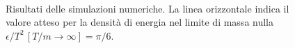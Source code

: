 \documentclass[a4paper,11pt]{article}
\begin{document}
    \begin{figure}[htb]
        \centering
         \\
        \caption{Risultati delle simulazioni numeriche. La linea orizzontale indica il valore atteso per la densità di energia nel limite di massa nulla $\epsilon/T^2 \, [T/m \to \infty] = \pi / 6$.}
        \label{fig:thermo_observables}
    \end{figure}
   
\end{document}
